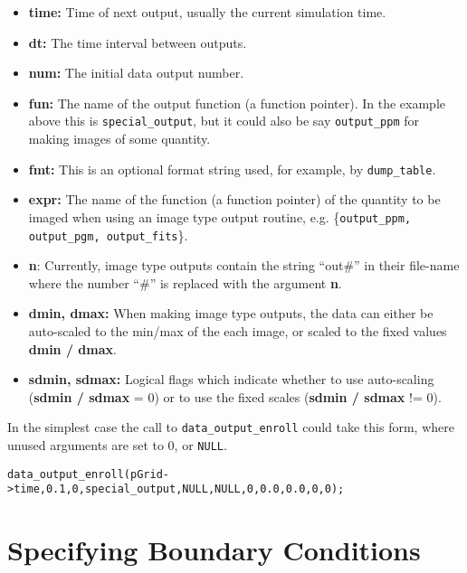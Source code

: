 \begin{itemize}

\item {\bf time:} Time of next output, usually the current simulation time.

\item {\bf dt:} The time interval between outputs.

\item {\bf num:} The initial data output number.

\item {\bf fun:} The name of the output function (a function pointer).  In
  the example above this is {\tt special\_output}, but it could also
  be say {\tt output\_ppm} for making images of some quantity.

\item {\bf fmt:} This is an optional format string used, for example,
  by {\tt dump\_table}.

\item {\bf expr:} The name of the function (a function pointer) of the
  quantity to be imaged when using an image type output routine,
  e.g. \{{\tt output\_ppm, output\_pgm, output\_fits}\}.

\item {\bf n}: Currently, image type outputs contain the string ``out\#'' 
in their file-name where the number ``\#'' is replaced with the argument 
{\bf n}.

\item {\bf dmin, dmax:} When making image type outputs, the data can 
either be auto-scaled to the min/max of the each image, or scaled to
the fixed values {\bf dmin / dmax}.

\item {\bf sdmin, sdmax:} Logical flags which indicate whether to use
auto-scaling ({\bf sdmin / sdmax} = 0) or to use the fixed scales
({\bf sdmin / sdmax} != 0).

\end{itemize}

In the simplest case the call to {\tt data\_output\_enroll} could take 
this form, where unused arguments are set to 0, or {\tt NULL}.
\begin{verbatim}
data_output_enroll(pGrid->time,0.1,0,special_output,NULL,NULL,0,0.0,0.0,0,0);
\end{verbatim}

\section{Specifying Boundary Conditions}

